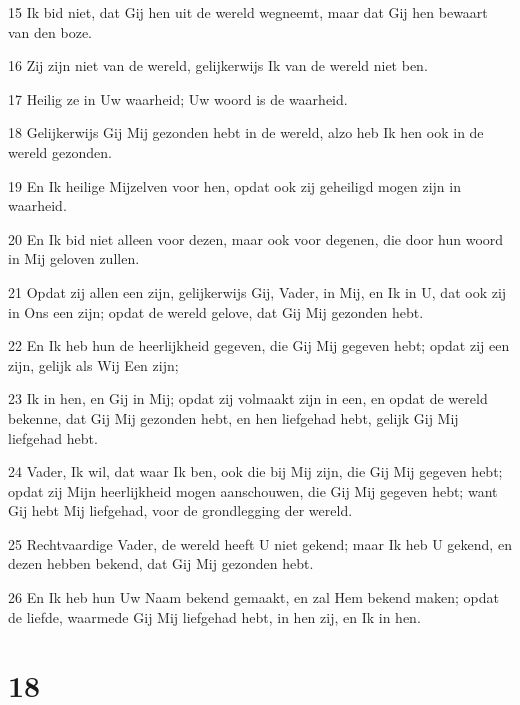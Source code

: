 \par 15 Ik bid niet, dat Gij hen uit de wereld wegneemt, maar dat Gij hen bewaart van den boze.
\par 16 Zij zijn niet van de wereld, gelijkerwijs Ik van de wereld niet ben.
\par 17 Heilig ze in Uw waarheid; Uw woord is de waarheid.
\par 18 Gelijkerwijs Gij Mij gezonden hebt in de wereld, alzo heb Ik hen ook in de wereld gezonden.
\par 19 En Ik heilige Mijzelven voor hen, opdat ook zij geheiligd mogen zijn in waarheid.
\par 20 En Ik bid niet alleen voor dezen, maar ook voor degenen, die door hun woord in Mij geloven zullen.
\par 21 Opdat zij allen een zijn, gelijkerwijs Gij, Vader, in Mij, en Ik in U, dat ook zij in Ons een zijn; opdat de wereld gelove, dat Gij Mij gezonden hebt.
\par 22 En Ik heb hun de heerlijkheid gegeven, die Gij Mij gegeven hebt; opdat zij een zijn, gelijk als Wij Een zijn;
\par 23 Ik in hen, en Gij in Mij; opdat zij volmaakt zijn in een, en opdat de wereld bekenne, dat Gij Mij gezonden hebt, en hen liefgehad hebt, gelijk Gij Mij liefgehad hebt.
\par 24 Vader, Ik wil, dat waar Ik ben, ook die bij Mij zijn, die Gij Mij gegeven hebt; opdat zij Mijn heerlijkheid mogen aanschouwen, die Gij Mij gegeven hebt; want Gij hebt Mij liefgehad, voor de grondlegging der wereld.
\par 25 Rechtvaardige Vader, de wereld heeft U niet gekend; maar Ik heb U gekend, en dezen hebben bekend, dat Gij Mij gezonden hebt.
\par 26 En Ik heb hun Uw Naam bekend gemaakt, en zal Hem bekend maken; opdat de liefde, waarmede Gij Mij liefgehad hebt, in hen zij, en Ik in hen.

\chapter{18}

